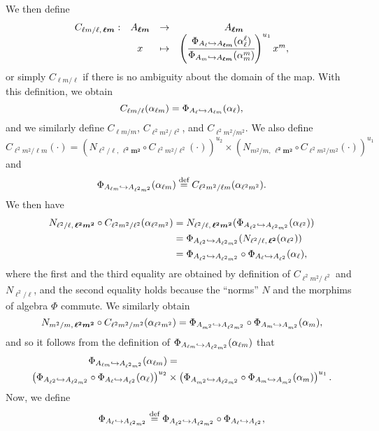 \documentclass[a4paper,11pt]{article}
\begin{document}
We then define
\[
\begin{array}{cccc}
  C_{\ell m/\ell,\, \bm{\ell m}}: & A_{\bm{\ell m}} & \to & A_{\bm{\ell m}} \\
  & x & \mapsto & \left( \cfrac{\Phi_{A_{\ell}\hookrightarrow A_{\bm{\ell
  m}}}(\alpha_{\ell}^{\ell})}{\Phi_{A_{m}\hookrightarrow A_{\bm{\ell
  m}}}(\alpha_{m}^{m})}\right)^{u_1} x^{m},
\end{array}
\]
or simply $C_{\ell m/\ell}$ if there is no ambiguity about the domain of the
map. With this definition, we obtain
\[
  C_{\ell m/\ell}(\alpha_{\ell m}) = \Phi_{A_{\ell}\hookrightarrow A_{\ell
  m}}(\alpha_{\ell}),
\]
and we similarly define $C_{\ell m/m}$, $C_{\ell^2m^2/\ell^2}$, and
$C_{\ell^2m^2/m^2}$. We also define 
\[
  C_{\ell^2m^2/\ell m}(\cdot) = \left(N_{\ell^2/\ell,\,\bm{\ell^2m^2}}\circ
  C_{\ell^2m^2/\ell^2}(\cdot)\right)^{u_2}\times \left(N_{m^2/m,\,\bm{\ell^2m^2}}\circ
  C_{\ell^2m^2/m^2}(\cdot)\right)^{u_1}
\]
and 
\[
  \Phi_{A_{\ell m}\hookrightarrow A_{\ell^2 m^2}}(\alpha_{\ell m})\overset{\text{def}}{=} C_{\ell^2m^2/\ell
  m}(\alpha_{\ell^2m^2}).
\]
We then have
\begin{align*}
  N_{\ell^2/\ell,\,\bm{\ell^2m^2}}\circ C_{\ell^2m^2/\ell^2}(\alpha_{\ell^2m^2})
  &= N_{\ell^2/\ell,\,\bm{\ell^2m^2}}(\Phi_{A_{\ell^2}\hookrightarrow
  A_{\ell^2m^2}}(\alpha_{\ell^2})) \\
  &= \Phi_{A_{\ell^2}\hookrightarrow
  A_{\ell^2m^2}}(N_{\ell^2/\ell,\,\bm{\ell^2}}(\alpha_{\ell^2})) \\
  &= \Phi_{A_{\ell^2}\hookrightarrow A_{\ell^2m^2}}\circ\Phi_{A_\ell\hookrightarrow
    A_{\ell^2}}(\alpha_\ell),
\end{align*}
where the first and the third equality are obtained by definition of
$C_{\ell^2m^2/\ell^2}$ and $N_{\ell^2/\ell}$, and the second equality holds
because the ``norms'' $N$ and the morphims of algebra $\Phi$ commute. We
similarly obtain
\[
  N_{m^2/m,\,\bm{\ell^2m^2}}\circ C_{\ell^2m^2/m^2}(\alpha_{\ell^2m^2}) =
  \Phi_{A_{m^2}\hookrightarrow A_{\ell^2m^2}}\circ\Phi_{A_m\hookrightarrow
    A_{m^2}}(\alpha_m),
\]
and so it follows from the definition of $\Phi_{A_{\ell m}\hookrightarrow
A_{\ell^2m^2}}(\alpha_{\ell m})$ that
\begin{align*}
  \Phi_{A_{\ell m}\hookrightarrow A_{\ell^2m^2}}(\alpha_{\ell m}) &= \\
  \left(\Phi_{A_{\ell^2}\hookrightarrow A_{\ell^2m^2}}\circ\Phi_{A_\ell\hookrightarrow
    A_{\ell^2}}(\alpha_\ell)\right)^{u_2}
    &\times \left(\Phi_{A_{m^2}\hookrightarrow A_{\ell^2m^2}}\circ\Phi_{A_m\hookrightarrow
      A_{m^2}}(\alpha_m)\right)^{u_1}.
\end{align*}
Now, we define
\[
  \Phi_{A_{\ell}\hookrightarrow A_{\ell^2m^2}}\overset{\text{def}}{=}\Phi_{A_{\ell^2}\hookrightarrow
  A_{\ell^2m^2}}\circ\Phi_{A_{\ell}\hookrightarrow A_{\ell^2}},
\]
\end{document}
